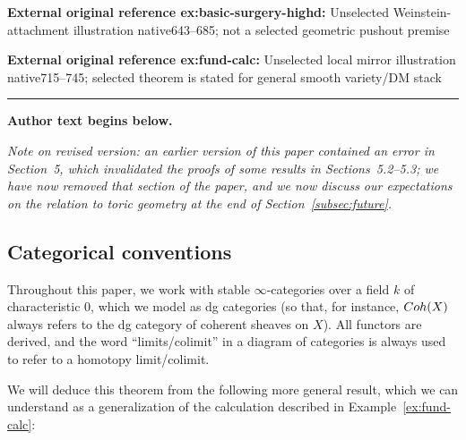 \documentclass[11pt]{article}
\numberwithin{equation}{section}
\numberwithin{equation}{section}
\newcommand{\Coh}{\textup{Coh}}
\begin{document}
\noindent\textbf{External original reference ex:basic-surgery-highd:} Unselected Weinstein-attachment illustration native643–685; not a selected geometric pushout premise\par
\noindent\textbf{External original reference ex:fund-calc:} Unselected local mirror illustration native715–745; selected theorem is stated for general smooth variety/DM stack\par
\medskip\hrule\medskip\noindent\textbf{Author text begins below.}\par

\textit{Note on revised version: an earlier version of this paper contained an error in Section~{\rm 5}, which invalidated the proofs of some results in Sections~{\rm 5.2--5.3}; we have now removed that section of the paper, and we now discuss our expectations on the relation to toric geometry at the end of Section~{\rm \ref{subsec:future}}.}


\subsection*{Categorical conventions}
Throughout this paper, we work with stable $\infty$-categories over a field $k$ of characteristic 0, which we model as dg categories (so that, for instance, $\Coh(X)$ always refers to the dg category of coherent sheaves on $X$). All functors are derived, and the word ``limits/colimit'' in a diagram of categories is always used to refer to a homotopy limit/colimit.

\setcounter{section}{4}\setcounter{Theorem}{12}\setcounter{equation}{3}
We will deduce this theorem from the following more general result, which we can understand as a generalization of the calculation described in Example~\ref{ex:fund-calc}:
\end{document}
